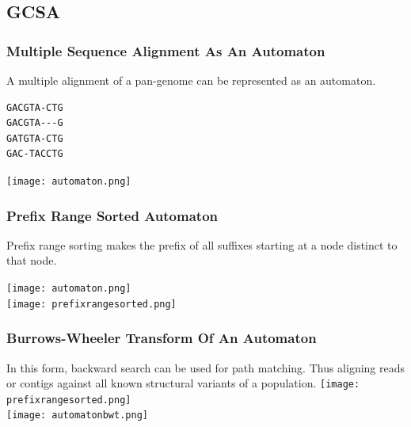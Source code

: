 \documentclass{beamer}
\begin{document}










\subsection{GCSA}
\begin{frame}[fragile]
\frametitle{Multiple Sequence Alignment As An Automaton}
A multiple alignment of a pan-genome can be represented as an automaton.

\begin{verbatim}
GACGTA-CTG
GACGTA---G
GATGTA-CTG
GAC-TACCTG
\end{verbatim}

\texttt{[image: automaton.png]}
\end{frame}
\begin{frame}
\frametitle{Prefix Range Sorted Automaton}
Prefix range sorting makes the prefix of all suffixes starting at a node distinct to that node.

\texttt{[image: automaton.png]} \\
\texttt{[image: prefixrangesorted.png]} 

\end{frame}
\begin{frame}
\frametitle{Burrows-Wheeler Transform Of An Automaton}
In this form, backward search can be used for path matching.  Thus aligning reads or contigs against all known structural variants of a population.
\texttt{[image: prefixrangesorted.png]} \\
\texttt{[image: automatonbwt.png]} 

\end{frame}
\end{document}
